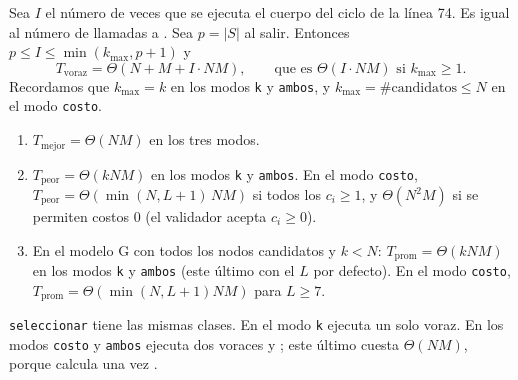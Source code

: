 \begin{proposicion}\label{prop:casos-voraz}
Sea $I$ el número de veces que se ejecuta el cuerpo del ciclo de la línea 74. Es igual al número de llamadas a . Sea $p=|S|$ al salir. Entonces $p\le I\le\min(k_{\max},p+1)$ y
\[
T_{\text{voraz}}=\Theta(N+M+I\cdot NM),\qquad\text{que es }\Theta(I\cdot NM)\text{ si }k_{\max}\ge1.
\]
Recordamos que $k_{\max}=k$ en los modos \texttt{k} y \texttt{ambos}, y $k_{\max}=\#\text{candidatos}\le N$ en el modo \texttt{costo}.
\begin{enumerate}[label=(\alph*),nosep]
\item $T_{\text{mejor}}=\Theta(NM)$ en los tres modos.
\item $T_{\text{peor}}=\Theta(kNM)$ en los modos \texttt{k} y \texttt{ambos}. En el modo \texttt{costo}, $T_{\text{peor}}=\Theta(\min(N,L+1)\,NM)$ si todos los $c_i\ge1$, y $\Theta(N^2M)$ si se permiten costos $0$ (el validador acepta $c_i\ge0$).
\item En el modelo G con todos los nodos candidatos y $k<N$: $T_{\text{prom}}=\Theta(kNM)$ en los modos \texttt{k} y \texttt{ambos} (este último con el $L$ por defecto). En el modo \texttt{costo}, $T_{\text{prom}}=\Theta(\min(N,L+1)NM)$ para $L\ge7$.
\end{enumerate}
\texttt{seleccionar} tiene las mismas clases. En el modo \texttt{k} ejecuta un solo voraz. En los modos \texttt{costo} y \texttt{ambos} ejecuta dos voraces y ; este último cuesta $\Theta(NM)$, porque calcula una vez .
\end{proposicion}
